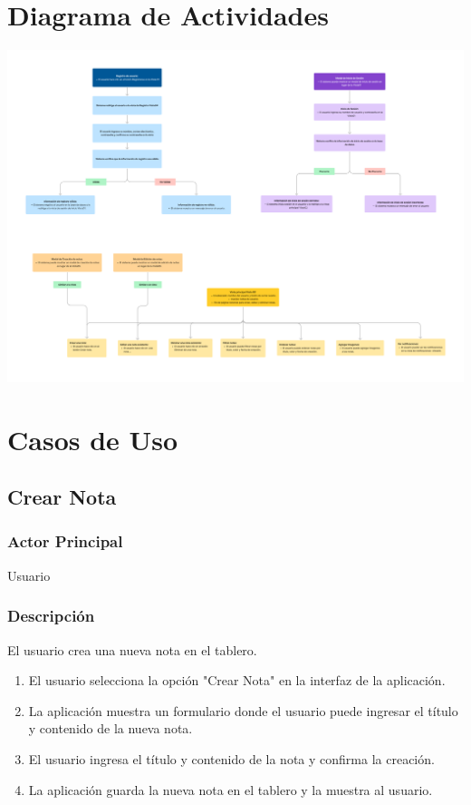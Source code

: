 \section{Diagrama de Actividades}
\begin{center}
\includegraphics[width=1\linewidth]{IMA/Diagrama de Actividades.png}
\end{center}

\section{Casos de Uso}
\subsection{Crear Nota}
\subsubsection{Actor Principal}
Usuario

\subsubsection{Descripción}
El usuario crea una nueva nota en el tablero.

\begin{enumerate}
  \item El usuario selecciona la opción "Crear Nota" en la interfaz de la aplicación.
  \item La aplicación muestra un formulario donde el usuario puede ingresar el título y contenido de la nueva nota.
  \item El usuario ingresa el título y contenido de la nota y confirma la creación.
  \item La aplicación guarda la nueva nota en el tablero y la muestra al usuario.
\end{enumerate}


